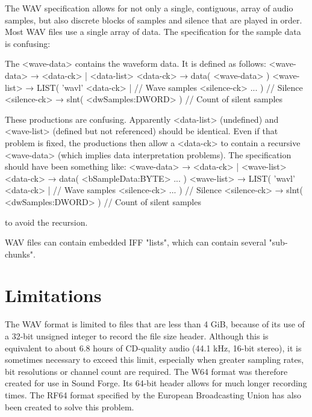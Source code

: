 \documentclass[12pt, a4paper]{article}
\begin{document}
The WAV specification allows for not only a single, contiguous, array of audio samples, but also discrete blocks of samples and silence that are played in order. Most WAV files use a single array of data. The specification for the sample data is confusing:

The <wave-data> contains the waveform data. It is defined as follows:\newline
  <wave-data>  → { <data-ck> | <data-list> }\newline
  <data-ck>    → data( <wave-data> )\newline
  <wave-list>  → LIST( 'wavl' { <data-ck> | // Wave samples\newline
                                <silence-ck> }... ) // Silence\newline
  <silence-ck> → slnt( <dwSamples:DWORD> ) // Count of silent samples\newline

These productions are confusing. Apparently <data-list> (undefined) and <wave-list> (defined but not referenced) should be identical. Even if that problem is fixed, the productions then allow a <data-ck> to contain a recursive <wave-data> (which implies data interpretation problems). The specification should have been something like:
\newline
<wave-data>  → { <data-ck> | <wave-list> }\newline
  <data-ck>    → data( <bSampleData:BYTE> ... )\newline
  <wave-list>  → LIST( 'wavl' { <data-ck> | // Wave samples\newline
                                <silence-ck> }... ) // Silence\newline
  <silence-ck> → slnt( <dwSamples:DWORD> ) // Count of silent samples\newline

to avoid the recursion.

WAV files can contain embedded IFF "lists", which can contain several "sub-chunks".

\section{Limitations}
The WAV format is limited to files that are less than 4 GiB, because of its use of a 32-bit unsigned integer to record the file size header. Although this is equivalent to about 6.8 hours of CD-quality audio (44.1 kHz, 16-bit stereo), it is sometimes necessary to exceed this limit, especially when greater sampling rates, bit resolutions or channel count are required. The W64 format was therefore created for use in Sound Forge. Its 64-bit header allows for much longer recording times. The RF64 format specified by the European Broadcasting Union has also been created to solve this problem.
\end{document}
